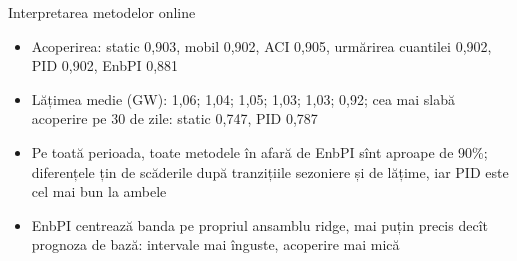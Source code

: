 \begin{frame}{Interpretarea metodelor online}
\itemsize{\small}
\begin{itemize}
    \item Acoperirea: static 0{,}903, mobil 0{,}902, ACI 0{,}905, urmărirea cuantilei 0{,}902, PID 0{,}902, EnbPI 0{,}881
    \item Lățimea medie (GW): 1{,}06; 1{,}04; 1{,}05; 1{,}03; 1{,}03; 0{,}92; cea mai slabă acoperire pe 30 de zile: static 0{,}747, PID 0{,}787
    \item Pe toată perioada, toate metodele în afară de EnbPI sînt aproape de 90\%; diferențele țin de scăderile după tranzițiile sezoniere și de lățime, iar PID este cel mai bun la ambele
    \item EnbPI centrează banda pe propriul ansamblu ridge, mai puțin precis decît prognoza de bază: intervale mai înguste, acoperire mai mică
\end{itemize}
\end{frame}

